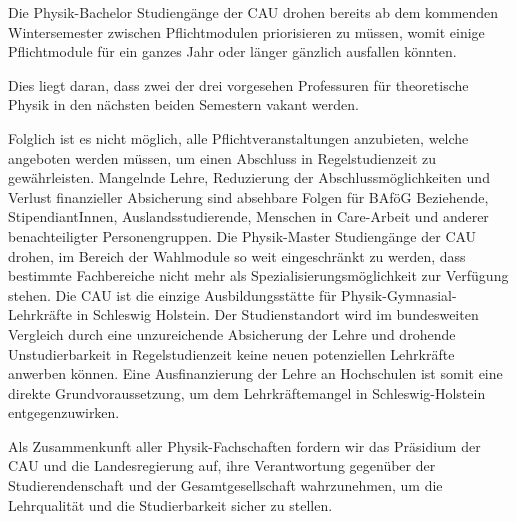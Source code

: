 \documentclass[DIV=calc]{scrartcl}
\begin{document}
Die Physik-Bachelor Studiengänge der CAU drohen bereits ab dem kommenden Wintersemester zwischen 
Pflichtmodulen priorisieren zu müssen, womit einige Pflichtmodule für ein ganzes Jahr oder länger 
gänzlich ausfallen könnten.

Dies liegt daran, dass zwei der drei vorgesehen Professuren für theoretische Physik in den nächsten 
beiden Semestern vakant werden. 

Folglich ist es nicht möglich, alle Pflichtveranstaltungen anzubieten, welche angeboten werden müssen, 
um einen Abschluss in Regelstudienzeit zu gewährleisten. Mangelnde Lehre, Reduzierung der Abschlussmöglichkeiten und Verlust finanzieller Absicherung sind absehbare Folgen für BAföG Beziehende, 
StipendiantInnen, Auslandsstudierende, Menschen in Care-Arbeit und anderer benachteiligter 
Personengruppen. Die Physik-Master Studiengänge der CAU drohen, im Bereich der Wahlmodule so weit 
eingeschränkt zu werden, dass bestimmte Fachbereiche nicht mehr als Spezialisierungsmöglichkeit zur 
Verfügung stehen. Die CAU ist die einzige Ausbildungsstätte für Physik-Gymnasial-Lehrkräfte in Schleswig
Holstein. Der Studienstandort wird im bundesweiten Vergleich durch eine unzureichende Absicherung der 
Lehre und drohende Unstudierbarkeit in Regelstudienzeit keine neuen potenziellen Lehrkräfte anwerben 
können. Eine Ausfinanzierung der Lehre an Hochschulen ist somit eine direkte Grundvoraussetzung, um 
dem Lehrkräftemangel in Schleswig-Holstein entgegenzuwirken. 

Als Zusammenkunft aller Physik-Fachschaften fordern wir das Präsidium der CAU und die Landesregierung 
auf, ihre Verantwortung gegenüber der Studierendenschaft und der Gesamtgesellschaft wahrzunehmen, 
um die Lehrqualität und die Studierbarkeit sicher zu stellen. 
\end{document}
